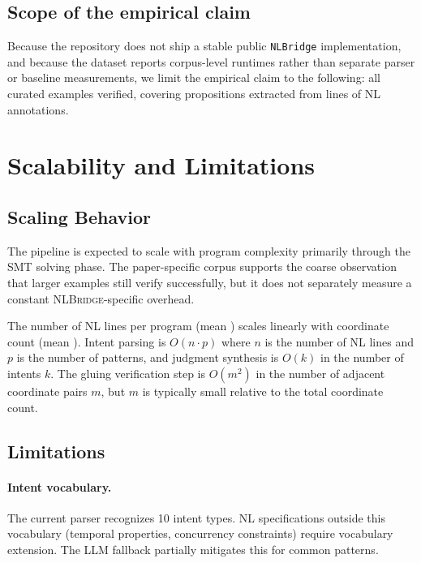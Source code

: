 \documentclass[11pt]{article}
\newcommand{\NLBridge}{\textsc{NLBridge}}
\begin{document}
\subsection{Scope of the empirical claim}

Because the repository does not ship a stable public \texttt{NLBridge}
implementation, and because the dataset reports corpus-level runtimes rather
than separate parser or baseline measurements, we limit the empirical claim to
the following: all \ppLXXprogramCount{} curated examples verified, covering
\ppLXXpropsTotal{} propositions extracted from \ppLXXnlLinesTotal{} lines of
NL annotations.

\section{Scalability and Limitations}\label{sec:scalability}

\subsection{Scaling Behavior}

The pipeline is expected to scale with program complexity primarily through
the SMT solving phase. The paper-specific corpus supports the coarse
observation that larger examples still verify successfully, but it does not
separately measure a constant \NLBridge-specific overhead.

The number of NL lines per program (mean \ppLXXnlLinesMean) scales
linearly with coordinate count (mean \ppLXXcoordsMean).  Intent
parsing is $O(n \cdot p)$ where $n$ is the number of NL lines and $p$
is the number of patterns, and judgment synthesis is $O(k)$ in the
number of intents $k$.  The gluing verification step is $O(m^2)$ in
the number of adjacent coordinate pairs $m$, but $m$ is typically
small relative to the total coordinate count.

\subsection{Limitations}

\paragraph{Intent vocabulary.}
The current parser recognizes 10 intent types.  NL specifications
outside this vocabulary (\eg temporal properties, concurrency
constraints) require vocabulary extension.  The LLM fallback partially
mitigates this for common patterns.
\end{document}
